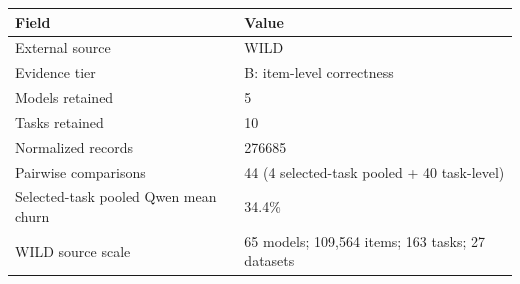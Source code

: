 \begin{tabular}{ll}
\toprule
Field & Value \\
\midrule
External source & WILD \\
Evidence tier & B: item-level correctness \\
Models retained & 5 \\
Tasks retained & 10 \\
Normalized records & 276685 \\
Pairwise comparisons & 44 (4 selected-task pooled + 40 task-level) \\
Selected-task pooled Qwen mean churn & 34.4\% \\
WILD source scale & 65 models; 109,564 items; 163 tasks; 27 datasets \\
\bottomrule
\end{tabular}
